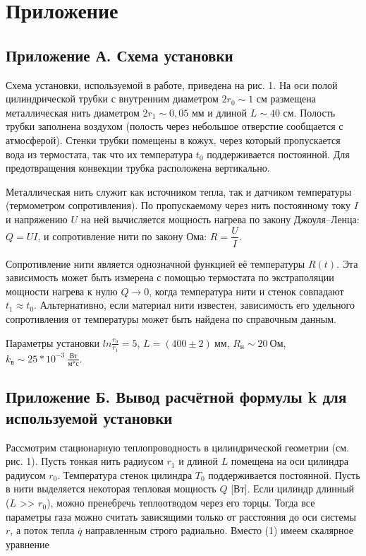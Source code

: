\chapter{Приложение}
\label{ch:appendix}

\section{Приложение А. Схема установки}

    Схема установки, используемой в работе, приведена на рис. 1. На оси полой цилиндрической трубки с внутренним диаметром $2r_0 \sim 1$ см размещена металлическая нить диаметром $2r_1 \sim 0,05$ мм и длиной $L \sim 40$ см. Полость трубки заполнена воздухом (полость через небольшое отверстие сообщается с атмосферой). Стенки трубки помещены в кожух, через который пропускается вода из термостата, так что их температура $t_0$ поддерживается постоянной. Для предотвращения конвекции трубка расположена вертикально.

    Металлическая нить служит как источником тепла, так и датчиком температуры (термометром сопротивления). По пропускаемому через нить постоянному току $I$ и напряжению $U$ на ней вычисляется мощность нагрева по закону Джоуля–Ленца: $Q = UI$, и сопротивление нити по закону Ома: $R = \dfrac{U}{I}$.

    Сопротивление нити является однозначной функцией её температуры $R (t)$.
    Эта зависимость может быть измерена с помощью термостата по экстраполяции мощности нагрева к нулю $Q \rightarrow 0$, когда температура нити и стенок совпадают $t_1 \approx t_0$. Альтернативно, если материал нити известен, зависимость его удельного сопротивления от температуры может быть найдена по справочным данным.

    Параметры установки $ ln \frac{r_0}{r_1} = 5$,  $L = (400 \pm 2)~\text{мм}$,  $R_\text{н} \sim 20~\text{Ом}$,  $k_\text{в} \sim 25 * 10^{-3}~\frac{\text{Вт}}{\text{м}*\text{с}} $.

\section{Приложение Б. Вывод расчётной формулы k для используемой установки}

    Рассмотрим стационарную теплопроводность в цилиндрической геометрии (см. рис. 1). Пусть тонкая нить радиусом $r_1$ и длиной $L$ помещена на оси цилиндра радиусом $r_0$. Температура стенок цилиндра $T_0$ поддерживается постоянной. Пусть в нити выделяется некоторая тепловая мощность $Q$ [Вт]. Если цилиндр длинный ($L$ >> $r_0$), можно пренебречь теплоотводом через его торцы. Тогда все параметры газа можно считать зависящими только от расстояния до оси системы $r$, а поток тепла $\overline{q}$ направленным строго радиально. Вместо (1) имеем скалярное уравнение

